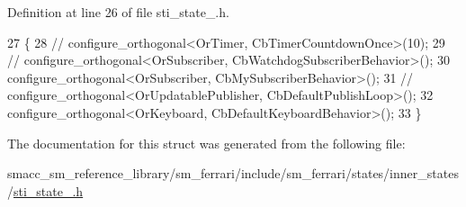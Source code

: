Definition at line 26 of file sti\+\_\+state\+\_.\+h.


\begin{DoxyCode}
27   \{
28     \textcolor{comment}{// configure\_orthogonal<OrTimer, CbTimerCountdownOnce>(10);}
29     \textcolor{comment}{// configure\_orthogonal<OrSubscriber, CbWatchdogSubscriberBehavior>();}
30     configure\_orthogonal<OrSubscriber, CbMySubscriberBehavior>();
31     \textcolor{comment}{// configure\_orthogonal<OrUpdatablePublisher, CbDefaultPublishLoop>();}
32      configure\_orthogonal<OrKeyboard, CbDefaultKeyboardBehavior>();
33   \}
\end{DoxyCode}


The documentation for this struct was generated from the following file\+:\begin{DoxyCompactItemize}
\item 
smacc\+\_\+sm\+\_\+reference\+\_\+library/sm\+\_\+ferrari/include/sm\+\_\+ferrari/states/inner\+\_\+states/\hyperlink{sm__ferrari_2include_2sm__ferrari_2states_2inner__states_2sti__state__2_8h}{sti\+\_\+state\+\_.\+h}\end{DoxyCompactItemize}
